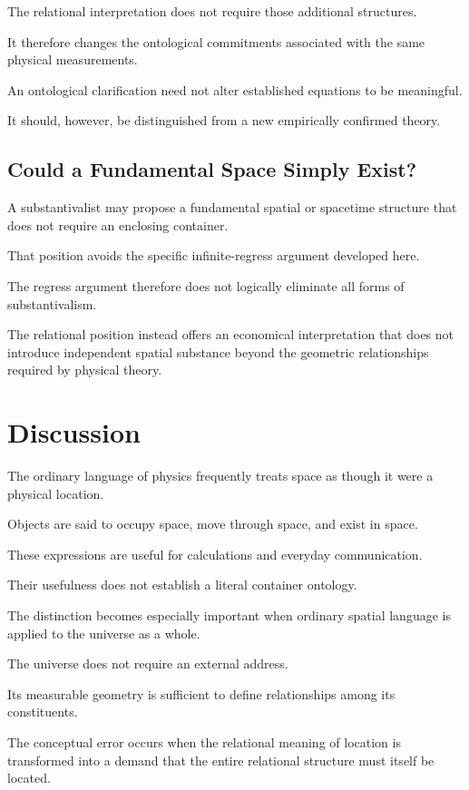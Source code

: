 \documentclass[12pt,onecolumn]{article}
\begin{document}
The relational interpretation
does not require those
additional structures.

It therefore changes the
ontological commitments
associated with the same
physical measurements.

An ontological clarification
need not alter established
equations to be meaningful.

It should, however, be
distinguished from a new
empirically confirmed theory.

\subsection{Could a Fundamental Space Simply Exist?}

A substantivalist may propose
a fundamental spatial or
spacetime structure that
does not require an enclosing
container.

That position avoids the
specific infinite-regress
argument developed here.

The regress argument therefore
does not logically eliminate
all forms of substantivalism.

The relational position
instead offers an economical
interpretation that does
not introduce independent
spatial substance beyond
the geometric relationships
required by physical theory.

\section{Discussion}

The ordinary language of
physics frequently treats
space as though it were
a physical location.

Objects are said to occupy
space, move through space,
and exist in space.

These expressions are useful
for calculations and everyday
communication.

Their usefulness does not
establish a literal container
ontology.

The distinction becomes
especially important when
ordinary spatial language
is applied to the universe
as a whole.

The universe does not
require an external address.

Its measurable geometry
is sufficient to define
relationships among its
constituents.

The conceptual error occurs
when the relational meaning
of location is transformed
into a demand that the
entire relational structure
must itself be located.
\end{document}

